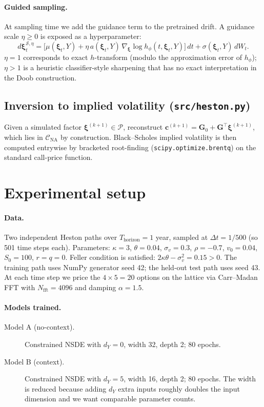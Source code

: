 \documentclass[11pt]{article}
\newcommand{\xib}{\boldsymbol{\xi}}
\newcommand{\1}{\mathbf{1}}
\begin{document}
\paragraph{Guided sampling.}
At sampling time we add the guidance term to the pretrained drift. A guidance scale $\eta \ge 0$ is exposed as a hyperparameter:
\begin{equation}
d\xib^{\mathcal S, \eta}_t = \bigl[\mu(\xib_t, Y) + \eta\, a(\xib_t, Y)\,\nabla_\xib \log h_\phi(t, \xib_t, Y)\bigr]\, dt + \sigma(\xib_t, Y)\, dW_t.
\end{equation}
$\eta = 1$ corresponds to exact $h$-transform (modulo the approximation error of $h_\phi$); $\eta > 1$ is a heuristic classifier-style sharpening that has no exact interpretation in the Doob construction.

\subsection{Inversion to implied volatility (\texttt{src/heston.py})}

Given a simulated factor $\xib^{(k+1)} \in \mathcal P$, reconstruct $\mathbf c^{(k+1)} = \mathbf G_0 + \mathbf G^\top \xib^{(k+1)}$, which lies in $\mathcal C_{\text{NA}}$ by construction. Black--Scholes implied volatility is then computed entrywise by bracketed root-finding (\texttt{scipy.optimize.brentq}) on the standard call-price function.

\section{Experimental setup}

\paragraph{Data.}
Two independent Heston paths over $T_{\text{horizon}} = 1$ year, sampled at $\Delta t = 1/500$ (so 501 time steps each). Parameters: $\kappa = 3$, $\theta = 0.04$, $\sigma_v = 0.3$, $\rho = -0.7$, $v_0 = 0.04$, $S_0 = 100$, $r = q = 0$. Feller condition is satisfied: $2 \kappa \theta - \sigma_v^2 = 0.15 > 0$. The training path uses NumPy generator seed 42; the held-out test path uses seed 43. At each time step we price the $4 \times 5 = 20$ options on the lattice via Carr--Madan FFT with $N_\text{fft} = 4096$ and damping $\alpha = 1.5$.

\paragraph{Models trained.}
\begin{description}
\item[Model A (no-context).] Constrained NSDE with $d_Y = 0$, width 32, depth 2; 80 epochs.
\item[Model B (context).] Constrained NSDE with $d_Y = 5$, width 16, depth 2; 80 epochs. The width is reduced because adding $d_Y$ extra inputs roughly doubles the input dimension and we want comparable parameter counts.
\end{description}
\end{document}
